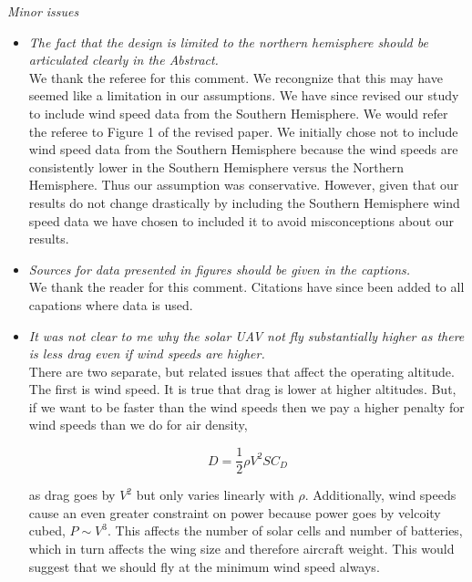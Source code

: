 \documentclass[10pt, a4paper]{article}
\begin{document}
\emph{Minor issues}
\begin{itemize}
    \item \emph{The fact that the design is limited to the northern hemisphere should be articulated clearly in the Abstract.} \\
We thank the referee for this comment.  
We recongnize that this may have seemed like a limitation in our assumptions.  
We have since revised our study to include wind speed data from the Southern Hemisphere.  
We would refer the referee to Figure 1 of the revised paper.  
We initially chose not to include wind speed data from the Southern Hemisphere because the wind speeds are consistently lower in the Southern Hemisphere versus the Northern Hemisphere.  
Thus our assumption was conservative.  
However, given that our results do not change drastically by including the Southern Hemisphere wind speed data we have chosen to included it to avoid misconceptions about our results. \\

    \item \emph{Sources for data presented in figures should be given in the captions.} \\
        We thank the reader for this comment.  Citations have since been added to all capations where data is used.  \\

    \item \emph{It was not clear to me why the solar UAV not fly substantially higher as there is less drag even if wind speeds are higher.} \\
    There are two separate, but related issues that affect the operating altitude.  The first is wind speed.  It is true that drag is lower at higher altitudes.  But, if we want to be faster than the wind speeds then we pay a higher penalty for wind speeds than we do for air density,  

    \begin{equation}
        D = \frac{1}{2} \rho V^2 S C_D
    \end{equation}
    
    as drag goes by $V^2$ but only varies linearly with $\rho$.  Additionally, wind speeds cause an even greater constraint on power because power goes by velcoity cubed, $P \sim V^3$.  This affects the number of solar cells and number of batteries, which in turn affects the wing size and therefore aircraft weight. This would suggest that we should fly at the minimum wind speed always.  


\end{itemize}
\end{document}
